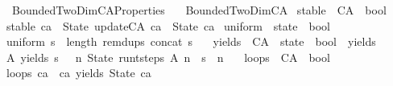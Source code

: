 %
\begin{isabellebody}%
%
%
\isadelimdocument
%
\endisadelimdocument
%
\isatagdocument
%
\isamarkuptrue%
%
\endisatagdocument
{\isafolddocument}%
%
\isadelimdocument
%
\endisadelimdocument
%
\isadelimtheory
%
\endisadelimtheory
%
\isatagtheory
{}\isamarkupfalse%
\ Bounded{\isacharunderscore}TwoDim{\isacharunderscore}CA{\isacharunderscore}Properties\isanewline
\ \ \ Bounded{\isacharunderscore}TwoDim{\isacharunderscore}CA\isanewline
{}%
\endisatagtheory
{\isafoldtheory}%
%
\isadelimtheory
\isanewline
%
\endisadelimtheory
\isanewline
{}\isamarkupfalse%
\ stable\ {\isacharcolon}{\isacharcolon}\ {\isachardoublequoteopen}CA\ {\isasymRightarrow}\ bool{\isachardoublequoteclose}\ \isanewline
{\isachardoublequoteopen}stable\ ca\ {\isasymequiv}\ State\ {\isacharparenleft}update{\isacharunderscore}CA\ ca{\isacharparenright}\ {\isacharequal}\ State\ ca{\isachardoublequoteclose}\isanewline
\isanewline
{}\isamarkupfalse%
\ uniform\ {\isacharcolon}{\isacharcolon}\ {\isachardoublequoteopen}state\ {\isasymRightarrow}\ bool{\isachardoublequoteclose}\ \isanewline
{\isachardoublequoteopen}uniform\ s\ {\isasymequiv}\ length\ {\isacharparenleft}remdups\ {\isacharparenleft}concat\ s{\isacharparenright}{\isacharparenright}\ {\isacharequal}\ {}{\isachardoublequoteclose}\isanewline
\isanewline
{}\isamarkupfalse%
\ yields\ {\isacharcolon}{\isacharcolon}\ {\isachardoublequoteopen}CA\ {\isasymRightarrow}\ state\ {\isasymRightarrow}\ bool{\isachardoublequoteclose}\ {\isacharparenleft}\ {\isacartoucheopen}yields{\isacartoucheclose}\ \ {}{}{\isacharparenright}\ \isanewline
{\isachardoublequoteopen}A\ yields\ s\ {\isasymequiv}\ {\isacharparenleft}{\isasymexists}\ n{\isachardot}\ State\ {\isacharparenleft}run{\isacharunderscore}t{\isacharunderscore}steps\ A\ n{\isacharparenright}\ {\isacharequal}\ s\ {\isasymand}\ n\ {\isachargreater}\ {}{\isacharparenright}{\isachardoublequoteclose}\isanewline
\isanewline
{}\isamarkupfalse%
\ loops\ {\isacharcolon}{\isacharcolon}\ {\isachardoublequoteopen}CA\ {\isasymRightarrow}\ bool{\isachardoublequoteclose}\ \isanewline
{\isachardoublequoteopen}loops\ ca\ {\isasymequiv}\ ca\ yields\ State\ ca{\isachardoublequoteclose}\isanewline

\end{isabellebody}
